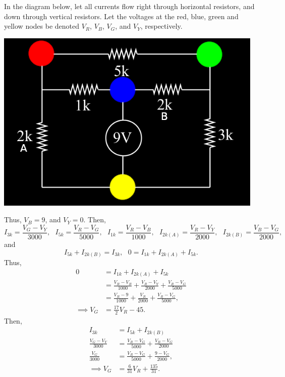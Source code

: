 \documentclass{article}
\begin{document}
\newpage
{}

In the diagram below, let all currents flow right through horizontal resistors, and down through vertical resistors.
Let the voltages at the red, blue, green and yellow nodes be denoted $V_R$, $V_B$, $V_G$, and $V_Y$, respectively.
\begin{center}
    \includegraphics[scale=.65]{circuit.png}
\end{center}
Thus, $V_B = 9$, and $V_Y = 0$.
Then, $$I_{3k} = \frac{V_G - V_Y}{3000},~~~ I_{5k} = \frac{V_R - V_G}{5000},~~~ I_{1k} = \frac{V_R - V_B}{1000},~~~ I_{2k(A)} = \frac{V_R - V_Y}{2000},~~~ I_{2k(B)} = \frac{V_B - V_G}{2000},$$
and $$I_{5k} + I_{2k(B)} = I_{3k},~~~ 0 = I_{1k} + I_{2k(A)} + I_{5k}.$$
Thus,
\begin{align*}
             0   &= I_{1k} + I_{2k(A)} + I_{5k} \\
                 &= \frac{V_R - V_B}{1000} + \frac{V_R - V_Y}{2000} + \frac{V_R - V_G}{5000} \\
                 &= \frac{V_R - 9}{1000} + \frac{V_R}{2000} + \frac{V_R - V_G}{5000}, \\
    \implies V_G &= \frac{17}2V_R - 45.
\end{align*}
Then,
\begin{align*}
    I_{3k}                 &= I_{5k} + I_{2k(B)} \\
    \frac{V_G - V_Y}{3000} &= \frac{V_R - V_G}{5000} + \frac{V_B - V_G}{2000} \\
    \frac{V_G}{3000}       &= \frac{V_R - V_G}{5000} + \frac{9 - V_G}{2000}, \\
    \implies V_G           &= \frac{6}{31}V_R+\frac{135}{31}.
\end{align*}
\end{document}

